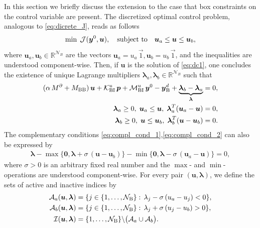 \documentclass[a4paper,10pt]{article}
\numberwithin{theorem}{section}
\begin{document}
In this section we briefly discuss the extension to the case that box constraints on the control variable are present. The discretized optimal control problem, analogous to \eqref{eq:dicrete_J},  reads as follows 
\begin{align}\label{eq:dc1}
 \min \; \mathcal{J}(\boldsymbol{y}^0,\boldsymbol{u}), \quad \hbox{subject to} \quad \boldsymbol{u}_a \leq \boldsymbol{u} \leq \boldsymbol{u}_b,
\end{align}
where $\boldsymbol{u}_a,\boldsymbol{u}_b \in \mathbb{R}^{\mathcal{N}_B}$ are the vectors $\boldsymbol{u}_a = u_a\,\vec 1, \boldsymbol{u}_b=u_b\,\vec 1$, and the inequalities are understood component-wise. Then, if $\boldsymbol{u}$ is the solution of \eqref{eq:dc1}, one concludes the existence of unique  Lagrange multipliers $\boldsymbol{\lambda}_a, \boldsymbol{\lambda}_b \in \mathbb{R}^{\mathcal{N}_B}$  such that 
\begin{subequations}\label{eq:dc2}
\begin{align}
(\alpha\,M^\partial+M_{\textup{BB}}) \,\boldsymbol u + \mathcal K_{\textup{BI}}^u\,\boldsymbol{p} + \mathcal M_{\textup{BI}}^u\,\boldsymbol{y}^0
	- \boldsymbol{y}^d_{\textup{B}} + \underbrace{\boldsymbol{\lambda}_b - \boldsymbol{\lambda}_a}_{\boldsymbol{\lambda}} &= 0, \\
\boldsymbol{\lambda}_a \geq 0, \; \boldsymbol{u}_a \leq \boldsymbol{u}, \; \boldsymbol{\lambda}_a^T (\boldsymbol{u}_a - \boldsymbol{u})  &=  0,\label{eq:compl_cond_1} \\
\boldsymbol{\lambda}_b \geq 0, \; \boldsymbol{u} \leq \boldsymbol{u}_b, \; \boldsymbol{\lambda}_b^T (\boldsymbol{u} - \boldsymbol{u}_b) &=  0.\label{eq:compl_cond_2}
\end{align}
\end{subequations}
The complementary conditions \eqref{eq:compl_cond_1},\eqref{eq:compl_cond_2} can also be expressed by
\begin{align}\label{eq:dc3}
\boldsymbol{\lambda} - \max\{\boldsymbol{0}, \boldsymbol{\lambda} + \sigma \, (\boldsymbol{u} - \boldsymbol{u}_b) \}  
                     - \min\{\boldsymbol{0}, \boldsymbol{\lambda} - \sigma \, (\boldsymbol{u}_a - \boldsymbol{u})\} = 0,
\end{align}
where $\sigma > 0 $ is an arbitrary fixed real number and the $\max$- and $\min$-operations are understood component-wise. For every pair $(\boldsymbol{u}, \boldsymbol{\lambda})$, we define the sets of active and inactive indices by
\begin{subequations}\label{eq:dc4}
\begin{align}
\mathcal{A}_a(\boldsymbol{u}, \boldsymbol{\lambda}) &= \{ j\in \{1,\ldots,\mathcal N_{\textup{B}}\}: \, \lambda_j - \sigma \, (u_a - u_j) < 0 \}, \\
\mathcal{A}_b(\boldsymbol{u}, \boldsymbol{\lambda}) &= \{ j\in \{1,\ldots,\mathcal N_{\textup{B}}\}: \, \lambda_j + \sigma \, (u_j - u_b) > 0 \}, \\
\mathcal{I}(\boldsymbol{u}, \boldsymbol{\lambda}) &= \{1, \ldots, \mathcal{N}_{\textup B}\} \backslash \big( \mathcal{A}_a \cup \mathcal{A}_b \big).
\end{align}
\end{subequations}
\end{document}
